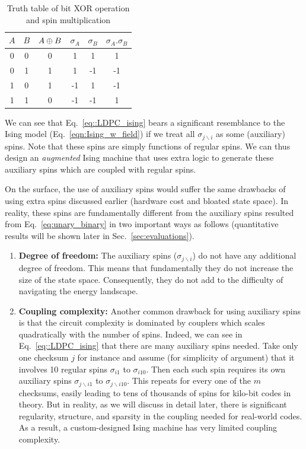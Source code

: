 \begin{table}
\footnotesize
\centering
\caption{Truth table of bit XOR operation and spin multiplication  }
\setlength{\tabcolsep}{2pt}
\label{tabel:truth_table}
\begin{tabular}{|c|c|c|c|c|c|} 
\hline
$A$ &  $B$ &  $A \oplus B$ & $\sigma_A$ & $\sigma_B$ & $\sigma_A.\sigma_B$ \\ 
\hline\hline
 0 &  0  & 0 & 1 & 1 & 1\\  
\hline
0  &  1 & 1 & 1 & -1 & -1\\   
\hline
1    & 0 & 1 & -1& 1& -1\\ 
\hline
1    & 1 & 0  & -1 & -1 & 1\\ 
\hline
\end{tabular}
\end{table}

We can see that Eq.~\ref{eq::LDPC_ising} bears a significant resemblance to the Ising model 
(Eq.~\ref{eqn:Ising_w_field}) if we treat all $\sigma_{j\backslash i}$ as some (auxiliary) spins. 
Note that these spins are simply functions of regular spins.
We can thus design an \emph{augmented} Ising machine that uses extra logic to generate these
auxiliary spins which are coupled with regular spins. 

On the surface, the use of auxiliary spins would suffer the same drawbacks of using extra
spins discussed earlier (hardware cost and bloated state space). In reality, these spins  
are fundamentally different from the 
auxiliary spins resulted from Eq.~\ref{eq:unary_binary} in two important ways as follows
(quantitative results will be shown later in Sec.~\ref{sec:evaluations}).
\begin{enumerate}
    \item \textbf{Degree of freedom:} The auxiliary spins ($\sigma_{j\backslash i}$) do not have
    any additional degree of freedom. This means that fundamentally they do not increase the size
    of the state space. Consequently, they do not add to the difficulty of navigating the energy landscape.
    
    \item \textbf{Coupling complexity:} Another common drawback for using auxiliary spins is that the
    circuit complexity is dominated by couplers which scales quadratically with the number of spins. 
    Indeed, we can see in Eq.~\ref{eq::LDPC_ising} that there are many auxiliary spins needed. 
    Take only one checksum $j$ for instance and assume
    (for simplicity of argument) that it involves 10 regular spins $\sigma_{i1}$ to $\sigma_{i10}$. 
    Then each such spin requires its own auxiliary spins $\sigma_{j\backslash i1}$ to 
    $\sigma_{j\backslash i10}$. This repeats for every one of the $m$ checksums, easily leading
    to tens of thousands of spins for kilo-bit codes in theory. But in reality, as we will 
    discuss in detail later,
    there is significant regularity, structure, and sparsity in the coupling needed for
    real-world codes. As a result, a custom-designed Ising machine has very limited coupling
    complexity.
\end{enumerate}

